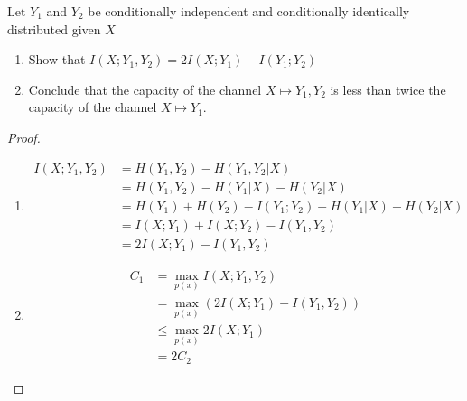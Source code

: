 \begin{exercise}{ Let $Y_{1}$ and $Y_{2}$ be conditionally independent and conditionally identically distributed given $X$
  \begin{enumerate}
    \item Show that $I\left(X ; Y_{1}, Y_{2}\right)=2 I\left(X ; Y_{1}\right)-I\left(Y_{1} ; Y_{2}\right)$
    \item Conclude that the capacity of the channel $X\mapsto Y_1,Y_2$ is less than twice the capacity of the channel $X \mapsto Y_1$.
  \end{enumerate}}
  \begin{proof}
  \par{~}
  \begin{enumerate}
    \item {
      \begin{equation}
        \begin{aligned}
          I(X;Y_1,Y_2) &= H(Y_1,Y_2) - H(Y_1,Y_2|X) \\
          &= H(Y_1,Y_2) - H(Y_1|X) - H(Y_2|X) \\
          &= H(Y_1) + H(Y_2) - I(Y_1;Y_2) -  H(Y_1|X) - H(Y_2|X) \\
          &=I(X;Y_1) + I(X;Y_2)- I(Y_1,Y_2) \\
          &= 2I(X;Y_1) - I(Y_1,Y_2)
        \end{aligned}
      \end{equation}
     }
    \item { 
\begin{equation}
  \begin{aligned}
    C_1 &= \max_{p(x)} I(X;Y_1,Y_2) \\
    &= \max_{p(x)} (2I(X;Y_1) - I(Y_1,Y_2)) \\
    &\le \max_{p(x)} 2I(X;Y_1) \\
    &= 2C_2
  \end{aligned}
\end{equation}
    }
  \end{enumerate}
  \end{proof}
  \label{ex9-1}
\end{exercise}

